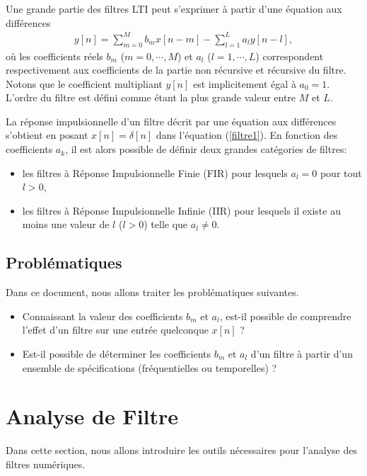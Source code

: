 \documentclass[11pt,a4paper]{IEEEtran}
\begin{document}
Une grande partie des filtres LTI peut s'exprimer à partir d'une équation aux différences
\begin{align}
y[n]=\sum_{m=0}^{M}b_m x[n-m]-\sum_{l=1}^{L}a_l y[n-l],\label{filtre1}
\end{align}
où les coefficients réels $b_m$ ($m=0,\cdots,M$) et $a_l$ ($l=1,\cdots,L$) correspondent respectivement aux coefficients de la partie non récursive et récursive du filtre. Notons que le coefficient multipliant $y[n]$ est implicitement égal à $a_0=1$. L'ordre du filtre est défini comme étant la plus grande valeur entre $M$ et $L$. 

La réponse impulsionnelle d'un filtre décrit par une équation aux différences s'obtient en posant $x[n]=\delta[n]$ dans l'équation (\ref{filtre1}). En fonction des coefficients $a_k$, il est alors possible de définir deux grandes catégories de filtres:
\begin{itemize}
\item les filtres à Réponse Impulsionnelle Finie (FIR) pour lesquels $a_l=0$ pour tout $l>0$,
\item les filtres à Réponse Impulsionnelle Infinie (IIR) pour lesquels il existe au moins une valeur de $l$ ($l>0$) telle que $a_l\ne 0$.
\end{itemize}

\subsection{Problématiques}

Dans ce document, nous allons traiter les problématiques suivantes.

\begin{itemize}
\item Connaissant la valeur des coefficients $b_m$ et $a_l$, est-il possible de comprendre l'effet d'un filtre sur une entrée quelconque $x[n]$  ? 
\item Est-il possible de déterminer les coefficients $b_m$ et $a_l$ d'un filtre à partir d'un ensemble de spécifications (fréquentielles ou temporelles) ?
\end{itemize}

\section{Analyse de Filtre}
\label{analyse}

Dans cette section, nous allons introduire les outils nécessaires pour l'analyse des filtres numériques. 
\end{document}
